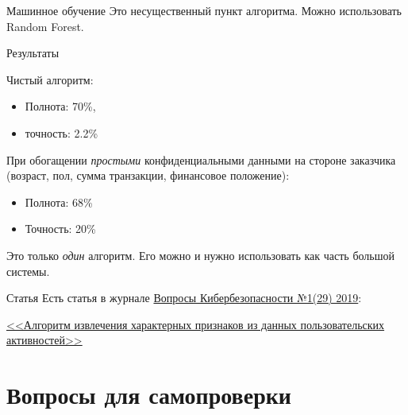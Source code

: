 \begin{frame}{Машинное обучение}
	Это несущественный пункт алгоритма. 
	Можно использовать Random Forest.
\end{frame}

\begin{frame}{Результаты}
	
	Чистый алгоритм:
	\begin{itemize}
		\item Полнота: 70\%, 
		\item точность: 2.2\%
	\end{itemize}
	
	При обогащении \textit{простыми} конфиденциальными данными на стороне заказчика (возраст, пол, сумма транзакции, финансовое положение):
	\begin{itemize}
		\item Полнота: 68\%
		\item Точность: 20\%
	\end{itemize}
	
	Это только \textit{один} алгоритм. Его можно и нужно использовать 
	как часть большой системы.
	 
\end{frame}

\begin{frame}{Статья}
	Есть статья в журнале \href{https://cyberrus.com/archives/1341}{Вопросы Кибербезопасности №1(29) 2019}:
	
	\href{http://cyberrus.com/wp-content/uploads/2019/03/53-58-129-19_7.-Slipenchuk.pdf}{<<Алгоритм извлечения характерных признаков из данных пользовательских активностей>>}
\end{frame}







\section{Вопросы для самопроверки}

